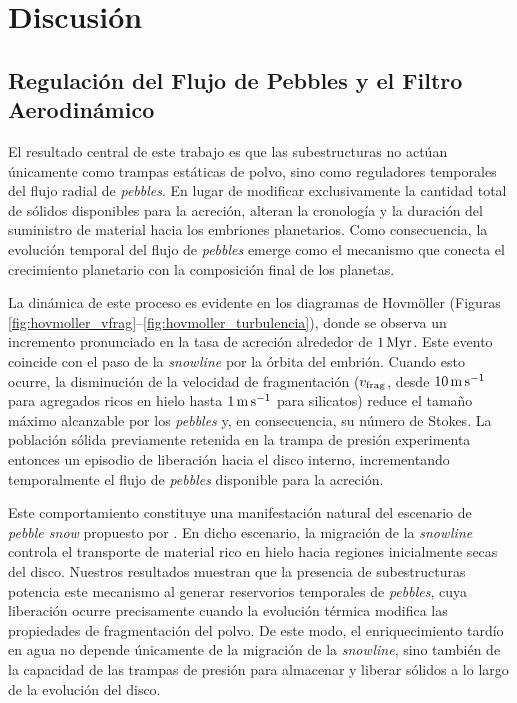 
\chapter{Discusión}
\label{cap:discusion}
\section{Regulación del Flujo de Pebbles y el Filtro Aerodinámico}

El resultado central de este trabajo es que las subestructuras no actúan únicamente como trampas estáticas de polvo, sino como reguladores temporales del flujo radial de \textit{pebbles}. En lugar de modificar exclusivamente la cantidad total de sólidos disponibles para la acreción, alteran la cronología y la duración del suministro de material hacia los embriones planetarios. Como consecuencia, la evolución temporal del flujo de \textit{pebbles} emerge como el mecanismo que conecta el crecimiento planetario con la composición final de los planetas.

La dinámica de este proceso es evidente en los diagramas de Hovmöller (Figuras \ref{fig:hovmoller_vfrag}--\ref{fig:hovmoller_turbulencia}), donde se observa un incremento pronunciado en la tasa de acreción alrededor de $1\,{\rm Myr}$. Este evento coincide con el paso de la \textit{snowline} por la órbita del embrión. Cuando esto ocurre, la disminución de la velocidad de fragmentación ($v_{\rm frag}$, desde $10\,{\rm m\,s^{-1}}$ para agregados ricos en hielo hasta $1\,{\rm m\,s^{-1}}$ para silicatos) reduce el tamaño máximo alcanzable por los \textit{pebbles} y, en consecuencia, su número de Stokes. La población sólida previamente retenida en la trampa de presión experimenta entonces un episodio de liberación hacia el disco interno, incrementando temporalmente el flujo de \textit{pebbles} disponible para la acreción.

Este comportamiento constituye una manifestación natural del escenario de \textit{pebble snow} propuesto por \citet{Drazkowska2021}. En dicho escenario, la migración de la \textit{snowline} controla el transporte de material rico en hielo hacia regiones inicialmente secas del disco. Nuestros resultados muestran que la presencia de subestructuras potencia este mecanismo al generar reservorios temporales de \textit{pebbles}, cuya liberación ocurre precisamente cuando la evolución térmica modifica las propiedades de fragmentación del polvo. De este modo, el enriquecimiento tardío en agua no depende únicamente de la migración de la \textit{snowline}, sino también de la capacidad de las trampas de presión para almacenar y liberar sólidos a lo largo de la evolución del disco.

